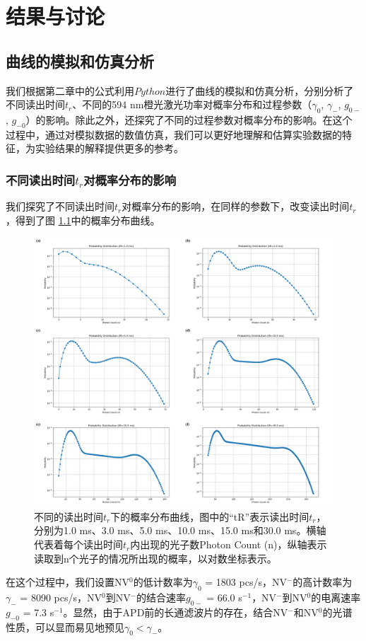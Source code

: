 \documentclass[type = bachelor]{whu-thesis}
\begin{document}

\chapter{结果与讨论}

\section{曲线的模拟和仿真分析}

我们根据第二章中的公式利用$Python$进行了曲线的模拟和仿真分析，分别分析了不同读出时间$t_r$、不同的594 nm橙光激光功率对概率分布和过程参数（$\gamma_0$, $\gamma_-$, $g_{0-}$, $g_{-0}$）的影响。除此之外，还探究了不同的过程参数对概率分布的影响。在这个过程中，通过对模拟数据的数值仿真，我们可以更好地理解和估算实验数据的特征，为实验结果的解释提供更多的参考。

\subsection{不同读出时间$t_r$对概率分布的影响}
我们探究了不同读出时间$t_r$对概率分布的影响，在同样的参数下，改变读出时间$t_r$，得到了图 \ref{fig: tR_variation}中的概率分布曲线。
\begin{figure}
  \centering
  \includegraphics[width=1.0\textwidth]{figures/Chapter 5/tR_variation.png}
  \caption[不同的读出时间$t_r$下的概率分布曲线]{不同的读出时间$t_r$下的概率分布曲线，图中的“tR”表示读出时间$t_r$，分别为1.0 ms、3.0 ms、5.0 ms、10.0 ms、15.0 ms和30.0 ms。横轴代表着每个读出时间$t_r$内出现的光子数Photon Count (n)，纵轴表示读取到n个光子的情况所出现的概率，以对数坐标表示。}
  \label{fig: tR_variation}
\end{figure}
在这个过程中，我们设置NV$^0$的低计数率为$\gamma_0$ = 1803 pcs/s，NV$^-$的高计数率为$\gamma_-$ = 8090 pcs/s，NV$^0$到NV$^-$的结合速率$g_{0-}$ = 66.0 s$^{-1}$，NV$^-$到NV$^0$的电离速率$g_{-0}$ = 7.3 s$^{-1}$。显然，由于APD前的长通滤波片的存在，结合NV$^-$和NV$^0$的光谱性质，可以显而易见地预见$\gamma_0 < \gamma_- $。
\end{document}
